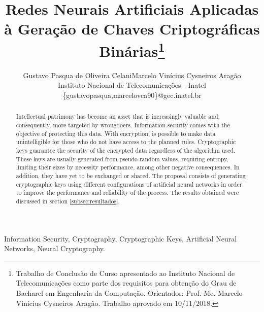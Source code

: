 \documentclass[a4paper,10pt,oneside,conference,final,keeplastbox]{inatel}
\begin{document}
\IEEEoverridecommandlockouts

    \title{Redes Neurais Artificiais Aplicadas à Geração de Chaves Criptográficas Binárias\thanks{Trabalho de Conclusão de Curso apresentado ao Instituto Nacional de Telecomunicações como parte dos requisitos para obtenção do Grau de Bacharel em Engenharia da Computação. Orientador: Prof. Me. Marcelo Vinícius Cysneiros Aragão. Trabalho aprovado em 10/11/2018.}}
    \author
    {
        \begin{tabular}{cc}
        Gustavo Pasqua de Oliveira Celani & Marcelo Vinícius Cysneiros Aragão \\
        \multicolumn{2}{c}{Instituto Nacional de Telecomunicações - Inatel} \\
        \multicolumn{2}{c}{\{gustavopasqua,marcelovca90\}@gec.inatel.br}
        \end{tabular}
    }
    \maketitle

    \begin{abstract}
        Intellectual patrimony has become an asset that is increasingly valuable and, consequently, more targeted by wrongdoers. Information security comes with the objective of protecting this data. With encryption, is possible to make data unintelligible for those who do not have access to the planned rules. Cryptographic keys guarantee the security of the encrypted data regardless of the algorithm used. These keys are usually generated from pseudo-random values, requiring entropy, limiting their sizes by necessity performance, among other negative consequences. In addition, they have yet to be exchanged or shared. The proposal consists of generating cryptographic keys using different configurations of artificial neural networks in order to improve the performance and reliability of the process. The results obtained were discussed in section \ref{subsec:resultados}.
    \end{abstract}

    \begin{keywords}
        Information Security, Cryptography, Cryptographic Keys, Artificial Neural Networks, Neural Cryptography.
    \end{keywords}
\end{document}
